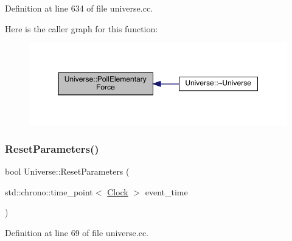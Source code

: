 Definition at line 634 of file universe.\+cc.

Here is the caller graph for this function\+:
\nopagebreak
\begin{figure}[H]
\begin{center}
\leavevmode
\includegraphics[width=350pt]{class_universe_a0c485c504542409cbb5cfd8543c35b11_icgraph}
\end{center}
\end{figure}
\mbox{\label{class_universe_a1d92b2277564577571c802f6e0c206dd}} 
\subsubsection{\texorpdfstring{Reset\+Parameters()}{ResetParameters()}}
{\footnotesize\ttfamily bool Universe\+::\+Reset\+Parameters (\begin{DoxyParamCaption}\item[{std\+::chrono\+::time\+\_\+point$<$ \hyperlink{universe_8h_a0ef8d951d1ca5ab3cfaf7ab4c7a6fd80}{Clock} $>$}]{event\+\_\+time }\end{DoxyParamCaption})}



Definition at line 69 of file universe.\+cc.

